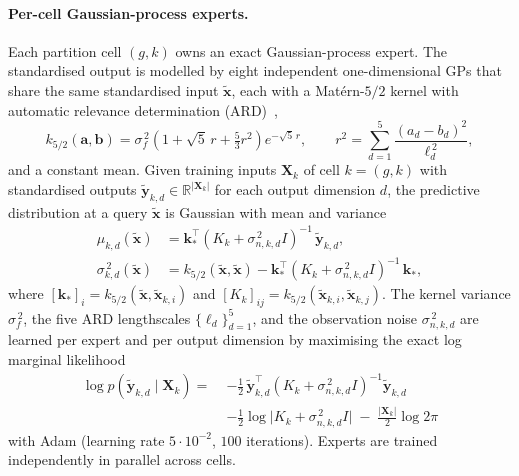 \paragraph{Per-cell Gaussian-process experts.}
Each partition cell $(g, k)$ owns an exact Gaussian-process expert.
The standardised output is modelled by eight independent
one-dimensional GPs that share the same standardised input
$\tilde{\mathbf{x}}$, each with a Mat\'ern-$5/2$ kernel with
automatic relevance determination
(ARD)~\cite{rasmussen2006gaussian},
\begin{equation}
\label{eq:matern}
    k_{5/2}(\mathbf{a}, \mathbf{b})
    = \sigma_f^{\,2}\!\left(
    1 + \sqrt{5}\,r + \tfrac{5}{3}r^{2}\right) e^{-\sqrt{5}\,r},
    \qquad
    r^{2}\!=\!\sum_{d=1}^{5}\frac{(a_d - b_d)^{2}}{\ell_d^{\,2}},
\end{equation}
and a constant mean. Given training inputs $\mathbf{X}_{k}$ of
cell $k = (g, k)$ with standardised outputs
$\tilde{\mathbf{y}}_{k,d} \in \mathbb{R}^{|\mathbf{X}_{k}|}$ for each
output dimension $d$, the predictive distribution at a query
$\tilde{\mathbf{x}}$ is Gaussian with mean and variance
\begin{align}
\label{eq:gp-predictive}
    \mu_{k,d}(\tilde{\mathbf{x}})
    &= \mathbf{k}_{*}^{\!\top}
       (K_{k} + \sigma_{n,k,d}^{\,2} I)^{-1}\,
       \tilde{\mathbf{y}}_{k,d},
\nonumber\\
    \sigma_{k,d}^{\,2}(\tilde{\mathbf{x}})
    &= k_{5/2}(\tilde{\mathbf{x}}, \tilde{\mathbf{x}})
       - \mathbf{k}_{*}^{\!\top}
       (K_{k} + \sigma_{n,k,d}^{\,2} I)^{-1}\,\mathbf{k}_{*},
\end{align}
where $[\mathbf{k}_{*}]_{i} = k_{5/2}(\tilde{\mathbf{x}},
\tilde{\mathbf{x}}_{k,i})$ and $[K_{k}]_{ij} = k_{5/2}(\tilde{\mathbf{x}}_{k,i},
\tilde{\mathbf{x}}_{k,j})$. The kernel variance $\sigma_f^{\,2}$, the
five ARD lengthscales $\{\ell_d\}_{d=1}^{5}$, and the observation
noise $\sigma_{n,k,d}^{\,2}$ are learned per expert and per output
dimension by maximising the exact log marginal likelihood
\begin{equation}
\label{eq:gp-mll}
\begin{aligned}
    \log p(\tilde{\mathbf{y}}_{k,d} \mid \mathbf{X}_{k})
    =\;
    &-\tfrac{1}{2}\,
        \tilde{\mathbf{y}}_{k,d}^{\!\top}
        (K_{k} + \sigma_{n,k,d}^{\,2} I)^{-1}
        \tilde{\mathbf{y}}_{k,d}
    \\
    &-\tfrac{1}{2}\log\!\bigl|K_{k} + \sigma_{n,k,d}^{\,2} I\bigr|
    \;-\; \tfrac{|\mathbf{X}_{k}|}{2}\log 2\pi
\end{aligned}
\end{equation}
with Adam (learning rate $5\cdot 10^{-2}$, $100$ iterations).
Experts are trained independently in parallel across cells.

